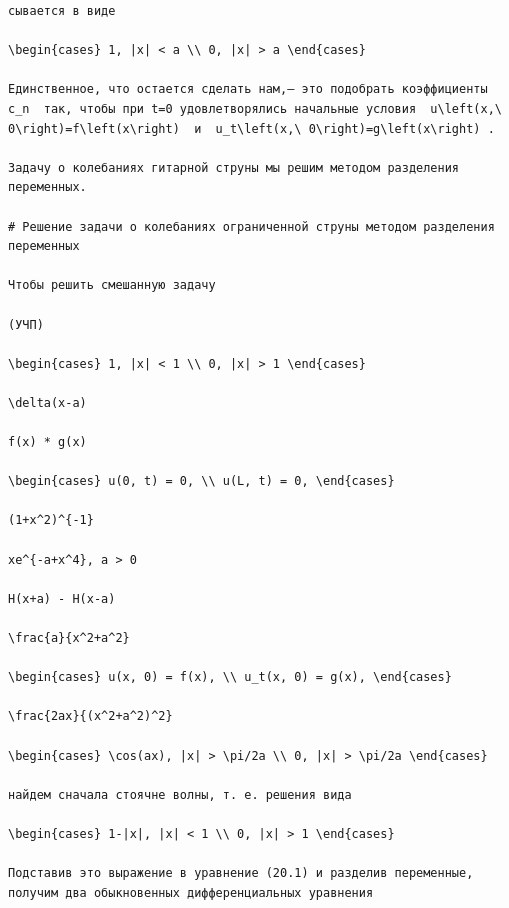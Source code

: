 \documentclass[
  ukrainian,
]{article}
\begin{document}
\begin{verbatim}
сывается в виде

\begin{cases} 1, |x| < a \\ 0, |x| > a \end{cases}

Единственное, что остается сделать нам,— это подобрать коэффициенты  c_n  так, чтобы при t=0 удовлетворялись начальные условия  u\left(x,\ 0\right)=f\left(x\right)  и  u_t\left(x,\ 0\right)=g\left(x\right) .

Задачу о колебаниях гитарной струны мы решим методом разделения переменных.

# Решение задачи о колебаниях ограниченной струны методом разделения переменных

Чтобы решить смешанную задачу

(УЧП)

\begin{cases} 1, |x| < 1 \\ 0, |x| > 1 \end{cases}

\delta(x-a)

f(x) * g(x)

\begin{cases} u(0, t) = 0, \\ u(L, t) = 0, \end{cases}

(1+x^2)^{-1}

xe^{-a+x^4}, a > 0

H(x+a) - H(x-a)

\frac{a}{x^2+a^2}

\begin{cases} u(x, 0) = f(x), \\ u_t(x, 0) = g(x), \end{cases}

\frac{2ax}{(x^2+a^2)^2}

\begin{cases} \cos(ax), |x| > \pi/2a \\ 0, |x| > \pi/2a \end{cases}

найдем сначала стоячне волны, т. е. решения вида

\begin{cases} 1-|x|, |x| < 1 \\ 0, |x| > 1 \end{cases}

Подставив это выражение в уравнение (20.1) и разделив переменные, получим два обыкновенных дифференциальных уравнения


\end{verbatim}
\end{document}
